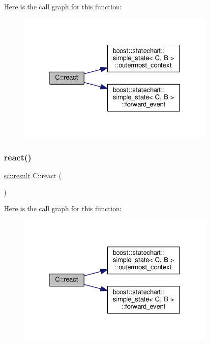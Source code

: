 Here is the call graph for this function\+:
\nopagebreak
\begin{figure}[H]
\begin{center}
\leavevmode
\includegraphics[width=278pt]{struct_c_a7c66bc54e8f268346ec27933ad446d5d_cgraph}
\end{center}
\end{figure}
\mbox{\label{struct_c_af44f3b580444ff4e97f803b18de14499}} 
\subsubsection{\texorpdfstring{react()}{react()}\hspace{0.1cm}{\footnotesize\ttfamily [2/3]}}
{\footnotesize\ttfamily \mbox{\hyperlink{namespaceboost_1_1statechart_abe807f6598b614d6d87bb951ecd92331}{sc\+::result}} C\+::react (\begin{DoxyParamCaption}\item[{const \mbox{\hyperlink{struct_ev_discard_in_b}{Ev\+Discard\+InB}} \&}]{ }\end{DoxyParamCaption})\hspace{0.3cm}{\ttfamily [inline]}}

Here is the call graph for this function\+:
\nopagebreak
\begin{figure}[H]
\begin{center}
\leavevmode
\includegraphics[width=278pt]{struct_c_af44f3b580444ff4e97f803b18de14499_cgraph}
\end{center}
\end{figure}
\mbox{\label{struct_c_ab564da3e047d017f15645aa4682ae8f3}} 

